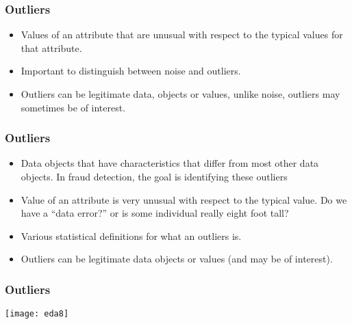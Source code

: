 
\begin{frame}[fragile]\frametitle{Outliers}

		\begin{itemize}
			\item Values of an attribute that are unusual with
			respect to the typical values for that attribute. 
			\item Important to distinguish between noise and outliers.
			\item  Outliers can be legitimate data, objects or values, unlike noise, outliers may sometimes be of interest. 
\end{itemize}
\end{frame}



\begin{frame}[fragile] \frametitle{Outliers}
\begin{itemize}
\item Data objects that have characteristics that differ from most other data objects. In fraud detection, the goal is identifying these outliers
\item Value of an attribute is very unusual with respect to the typical value. Do we have a ``data error?'' or is some individual really eight foot tall?
\item Various statistical definitions for what an outliers is.
\item Outliers can be legitimate data objects or values (and may be of interest).
\end{itemize}
\end{frame}

\begin{frame}[fragile] \frametitle{Outliers}
\begin{center}
\texttt{[image: eda8]}
\end{center}
\end{frame}

